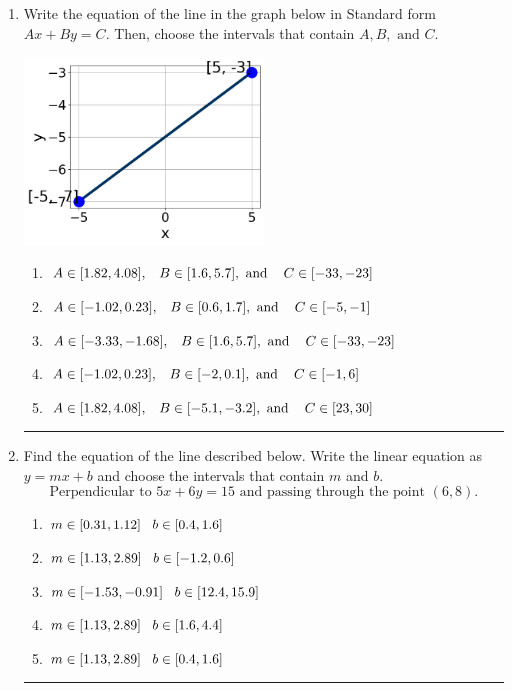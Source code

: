\documentclass[14pt]{extbook}
\newcommand{\litem}[1]{\item#1\hspace*{-1cm}\rule{\textwidth}{0.4pt}}
\begin{document}
\begin{enumerate}
{\begin{enumerate}[label=\Alph*.]
\end{enumerate} }
\litem{
Write the equation of the line in the graph below in Standard form $Ax+By=C$. Then, choose the intervals that contain $A, B, \text{ and } C$.
\begin{center}
    \includegraphics[width=0.5\textwidth]{../Figures/linearGraphToStandardCopyA.png}
\end{center}
\begin{enumerate}[label=\Alph*.]
\item \( A \in [1.82, 4.08], \hspace{3mm} B \in [1.6, 5.7], \text{ and } \hspace{3mm} C \in [-33, -23] \)
\item \( A \in [-1.02, 0.23], \hspace{3mm} B \in [0.6, 1.7], \text{ and } \hspace{3mm} C \in [-5, -1] \)
\item \( A \in [-3.33, -1.68], \hspace{3mm} B \in [1.6, 5.7], \text{ and } \hspace{3mm} C \in [-33, -23] \)
\item \( A \in [-1.02, 0.23], \hspace{3mm} B \in [-2, 0.1], \text{ and } \hspace{3mm} C \in [-1, 6] \)
\item \( A \in [1.82, 4.08], \hspace{3mm} B \in [-5.1, -3.2], \text{ and } \hspace{3mm} C \in [23, 30] \)

\end{enumerate} }
\litem{
Find the equation of the line described below. Write the linear equation as $ y=mx+b $ and choose the intervals that contain $m$ and $b$.\[ \text{Perpendicular to } 5 x + 6 y = 15 \text{ and passing through the point } (6, 8). \]\begin{enumerate}[label=\Alph*.]
\item \( m \in [0.31, 1.12] \hspace*{3mm} b \in [0.4, 1.6] \)
\item \( m \in [1.13, 2.89] \hspace*{3mm} b \in [-1.2, 0.6] \)
\item \( m \in [-1.53, -0.91] \hspace*{3mm} b \in [12.4, 15.9] \)
\item \( m \in [1.13, 2.89] \hspace*{3mm} b \in [1.6, 4.4] \)
\item \( m \in [1.13, 2.89] \hspace*{3mm} b \in [0.4, 1.6] \)


\end{enumerate}}
\end{enumerate}
\end{document}
